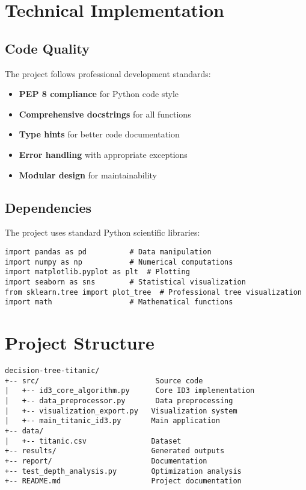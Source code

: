 \documentclass[12pt,a4paper]{article}
\begin{document}
\section{Technical Implementation}

\subsection{Code Quality}
The project follows professional development standards:
\begin{itemize}
    \item \textbf{PEP 8 compliance} for Python code style
    \item \textbf{Comprehensive docstrings} for all functions
    \item \textbf{Type hints} for better code documentation
    \item \textbf{Error handling} with appropriate exceptions
    \item \textbf{Modular design} for maintainability
\end{itemize}

\subsection{Dependencies}
The project uses standard Python scientific libraries:

\begin{lstlisting}[caption=Key Dependencies]
import pandas as pd          # Data manipulation
import numpy as np           # Numerical computations
import matplotlib.pyplot as plt  # Plotting
import seaborn as sns        # Statistical visualization
from sklearn.tree import plot_tree  # Professional tree visualization
import math                  # Mathematical functions
\end{lstlisting}

\section{Project Structure}

\begin{lstlisting}[caption=File Organization]
decision-tree-titanic/
+-- src/                           Source code
|   +-- id3_core_algorithm.py      Core ID3 implementation
|   +-- data_preprocessor.py       Data preprocessing
|   +-- visualization_export.py   Visualization system
|   +-- main_titanic_id3.py       Main application
+-- data/
|   +-- titanic.csv               Dataset
+-- results/                      Generated outputs
+-- report/                       Documentation
+-- test_depth_analysis.py        Optimization analysis
+-- README.md                     Project documentation
\end{lstlisting}
\end{document}
